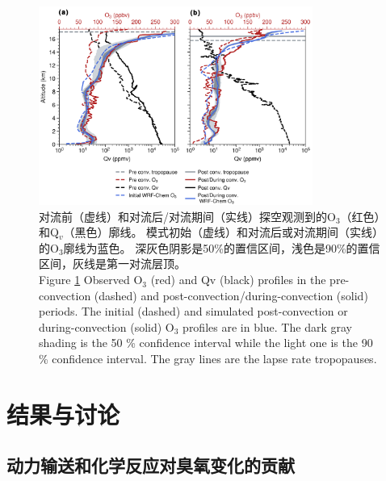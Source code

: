 \begin{figure}[htbp]
\centering
\includegraphics[width=0.8\textwidth]{./figures/ozonesonde_profile.png}
\caption{对流前（虚线）和对流后/对流期间（实线）探空观测到的O$_3$（红色）和Q$_v$（黑色）廓线。
模式初始（虚线）和对流后或对流期间（实线）的O$_3$廓线为蓝色。
深灰色阴影是50\%的置信区间，浅色是90\%的置信区间，灰线是第一对流层顶。\\
Figure \ref{fig:ozonesonde_profile} Observed O$_3$ (red) and Qv (black) profiles in the pre-convection (dashed) and post-convection/during-convection (solid) periods.
The initial (dashed) and simulated post-convection or during-convection (solid) O$_3$ profiles are in blue.
The dark gray shading is the 50 \% confidence interval while the light one is the 90 \% confidence interval.
The gray lines are the lapse rate tropopauses.
}
\label{fig:ozonesonde_profile}
\end{figure}




\section{结果与讨论}

\subsection{动力输送和化学反应对臭氧变化的贡献}




